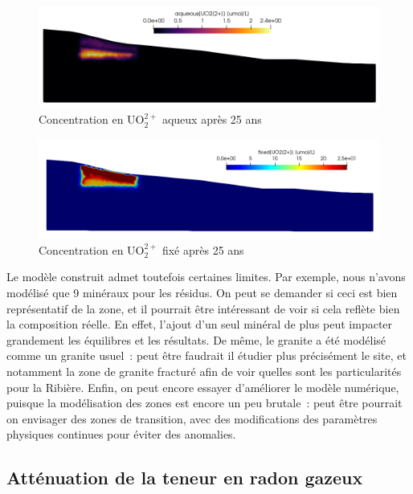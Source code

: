 \documentclass{article}
\begin{document}
\begin{figure}[H]
    \centering
    \includegraphics[width=\linewidth]{LJ-UO22P-final.PNG}
    \caption{Concentration en UO$_2^{2+}$ aqueux après 25 ans}
    \label{fig:uo2P-aqueux-final}
\end{figure}

\begin{figure}[H]
    \centering
    \includegraphics[width=\linewidth]{III_B_4_2.png}
    \caption{Concentration en UO$_2^{2+}$ fixé après 25 ans}
    \label{fig:uo2P-fixe-final}
\end{figure}

Le modèle construit admet toutefois certaines limites. Par exemple, nous n’avons modélisé que 9 minéraux pour les résidus. On peut se demander si ceci est bien représentatif de la zone, et il pourrait être intéressant de voir si cela reflète bien la composition réelle. En effet, l’ajout d’un seul minéral de plus peut impacter grandement les équilibres et les résultats. De même, le granite a été modélisé comme un granite usuel~: peut être faudrait il étudier plus précisément le site, et notamment la zone de granite fracturé afin de voir quelles sont les particularités pour la Ribière. Enfin, on peut encore essayer d’améliorer le modèle numérique, puisque la modélisation des zones est encore un peu brutale~: peut être pourrait on envisager des zones de transition, avec des modifications des paramètres physiques continues pour éviter des anomalies.

\subsection{Atténuation de la teneur en radon gazeux}
\end{document}
